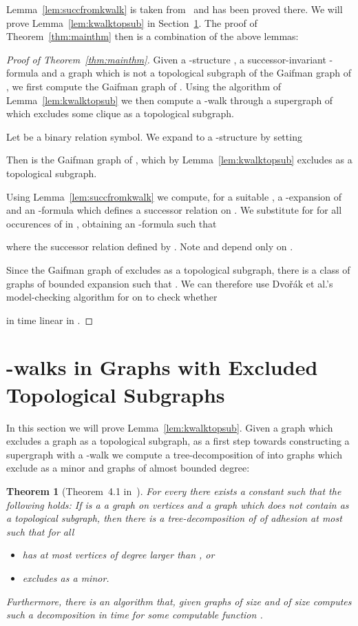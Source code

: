 \documentclass[12pt]{amsart}
\newtheorem{theorem}{Theorem}[section]
\begin{document}
Lemma~\ref{lem:succfromkwalk} is taken from~\cite[Lemma~4.4]{ekk13}
and has been proved there. We will prove Lemma~\ref{lem:kwalktopsub}
in Section~\ref{sec:kwalktopsub}. The proof of
Theorem~\ref{thm:mainthm} then is a combination of the above lemmas:
\begin{proof}[Proof of Theorem~\ref{thm:mainthm}]
  Given a -structure , a successor-invariant
  -formula  and a graph  which is
  not a topological subgraph of the Gaifman graph of , we first
  compute the Gaifman graph  of . Using the algorithm of
  Lemma~\ref{lem:kwalktopsub} we then compute a -walk  through a supergraph  of  which excludes some
  clique  as a topological subgraph.

  Let  be a binary relation symbol. We expand  to a
  -structure  by setting
  
  Then  is the Gaifman graph of , which by
  Lemma~\ref{lem:kwalktopsub} excludes  as a topological
  subgraph.

  Using Lemma~\ref{lem:succfromkwalk} we compute, for a suitable , a -expansion  of  and an
  -formula  which
  defines a successor relation on . We substitute
   for  for all
  occurences of  in , obtaining an
  -formula  such that
  
  where  the successor relation defined by
  . Note
   and  depend only on .

  Since the Gaifman graph  of  excludes  as a topological
  subgraph, there is a class  of graphs of bounded expansion
  such that . We can therefore use {Dvo\v r\'ak} et
  al.'s model-checking algorithm for  on  to check whether
  
  in time linear in .
\end{proof}

\section{-walks in Graphs with Excluded Topological Subgraphs}
\label{sec:kwalktopsub}


In this section we will prove Lemma~\ref{lem:kwalktopsub}. Given a
graph  which excludes a graph  as a topological subgraph, as a
first step towards constructing a supergraph  with a -walk we
compute a tree-decomposition of  into graphs which exclude  as a
minor and graphs of almost bounded degree:
\begin{theorem}[Theorem~4.1 in~\cite{gromar12+}]
  \label{thm:topminstructure}
  For every  there exists a constant  such
  that the following holds: If  is a a graph on  vertices and
   a graph which does not contain  as a topological subgraph, then
  there is a tree-decomposition  of  of adhesion at
  most  such that for all 
  \begin{itemize}
  \item   has at most  vertices of degree larger than
    , \emph{or}
  \item   excludes  as a minor.
  \end{itemize}
  Furthermore, there is an algorithm that, given graphs  of size
   and  of size  computes such a decomposition in time
   for some computable function .
\end{theorem}
\end{document}
